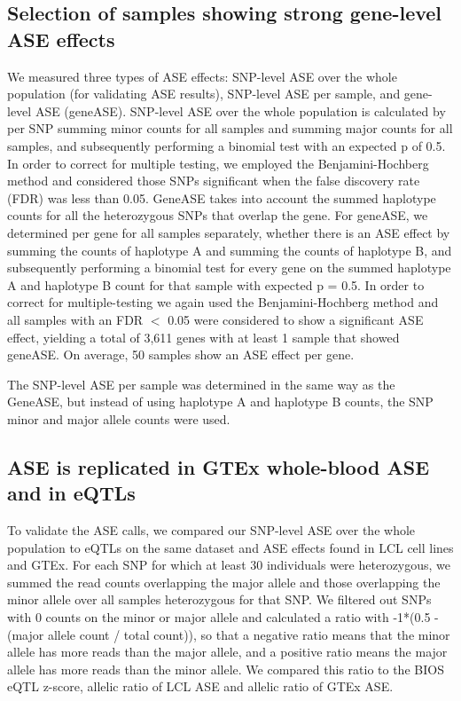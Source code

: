 {{\subsection{Selection of samples showing strong gene-level ASE effects}
We measured three types of ASE effects: SNP-level ASE over the whole population (for validating ASE results), SNP-level ASE per sample, and gene-level ASE (geneASE). SNP-level ASE over the whole population is calculated by per SNP summing minor counts for all samples and summing major counts for all samples, and subsequently performing a binomial test with an expected p of 0.5. In order to correct for multiple testing, we employed the Benjamini-Hochberg method and considered those SNPs significant when the false discovery rate (FDR) was less than 0.05. GeneASE takes into account the summed haplotype counts for all the heterozygous SNPs that overlap the gene. For geneASE, we determined per gene for all samples separately, whether there is an ASE effect by summing the counts of haplotype A and summing the counts of haplotype B, and subsequently performing a binomial test for every gene on the summed haplotype A and haplotype B count for that sample with expected p = 0.5. In order to correct for multiple-testing we again used the Benjamini-Hochberg method and all samples with an FDR $<$ 0.05 were considered to show a significant ASE effect, yielding a total of 3,611 genes with at least 1 sample that showed geneASE. On average, 50 samples show an ASE effect per gene.

The SNP-level ASE per sample was determined in the same way as the GeneASE, but instead of using haplotype A and haplotype B counts, the SNP minor and major allele counts were used.

\subsection{ASE is replicated in GTEx whole-blood ASE and in eQTLs}
To validate the ASE calls, we compared our SNP-level ASE over the whole population to eQTLs on the same dataset and ASE effects found in LCL cell lines\cite{deelenCallingGenotypesPublic2015a} and GTEx\cite{pirinenAssessingAllelespecificExpression2015a}. For each SNP for which at least 30 individuals were heterozygous, we summed the read counts overlapping the major allele and those overlapping the minor allele over all samples heterozygous for that SNP. We filtered out SNPs with 0 counts on the minor or major allele and calculated a ratio with -1*(0.5 - (major allele count / total count)), so that a negative ratio means that the minor allele has more reads than the major allele, and a positive ratio means the major allele has more reads than the minor allele. We compared this ratio to the BIOS eQTL z-score, allelic ratio of LCL ASE and allelic ratio of GTEx ASE. 

}}

